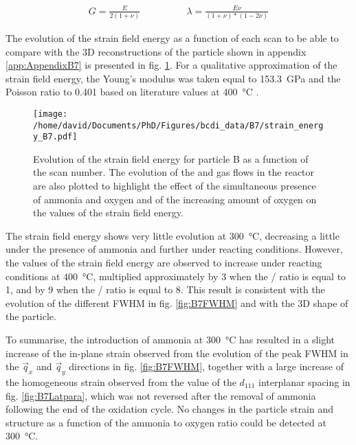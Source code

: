 \begin{align}
    G = \frac{E}{2(1+\nu)} \qquad & \qquad \lambda = \frac{E \nu}{(1+\nu)*(1-2\nu)}
    \label{eq:GandNu}
\end{align}

The evolution of the strain field energy as a function of each scan to be able to compare with the 3D reconstructions of the particle shown in appendix \ref{app:AppendixB7} is presented in fig. \ref{fig:B7SFE}.
For a qualitative approximation of the strain field energy, the Young's modulus was taken equal to \qty{153.3}{\giga\pascal} and the Poisson ratio to \num{0.401} based on literature values at \qty{400}{\degreeCelsius} \parencite{Matthey2022}.

\begin{figure}[!htb]
    \centering
    \texttt{[image: /home/david/Documents/PhD/Figures/bcdi\_data/B7/strain\_energy\_B7.pdf]}
    \caption{
        Evolution of the strain field energy for particle B as a function of the scan number.
        The evolution of the  and  gas flows in the reactor are also plotted to highlight the effect of the simultaneous presence of ammonia and oxygen and of the increasing amount of oxygen on the values of the strain field energy.
    }
    \label{fig:B7SFE}
\end{figure}

The strain field energy shows very little evolution at \qty{300}{\degreeCelsius}, decreasing a little under the presence of ammonia and further under reacting conditions.
However, the values of the strain field energy are observed to increase under reacting conditions at \qty{400}{\degreeCelsius}, multiplied approximately by \num{3} when the / ratio is equal to 1, and by \num{9} when the / ratio is equal to 8.
This result is consistent with the evolution of the different FWHM in fig. \ref{fig:B7FWHM} and with the 3D shape of the particle.

To summarise, the introduction of ammonia at \qty{300}{\degreeCelsius} has resulted in a slight increase of the in-plane strain observed from the evolution of the peak FWHM in the $\vec{q}_x$ and $\vec{q}_y$ directions in fig. \ref{fig:B7FWHM}, together with a large increase of the homogeneous strain observed from the value of the $d_{111}$ interplanar spacing in fig. \ref{fig:B7Latpara}, which was not reversed after the removal of ammonia following the end of the oxidation cycle.
No changes in the particle strain and structure as a function of the ammonia to oxygen ratio could be detected at \qty{300}{\degreeCelsius}.

